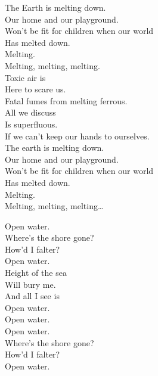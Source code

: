 The Earth is melting down. \\
Our home and our playground. \\
Won't be fit for children when our world \\
Has melted down. \\

Melting. \\
Melting, melting, melting. \\

Toxic air is \\
Here to scare us. \\
Fatal fumes from melting ferrous. \\
All we discuss \\
Is superfluous. \\
If we can't keep our hands to ourselves. \\

The earth is melting down. \\
Our home and our playground. \\
Won't be fit for children when our world \\
Has melted down. \\

Melting. \\
Melting, melting, melting… \\





Open water. \\
Where's the shore gone? \\
How'd I falter? \\
Open water. \\

Height of the sea \\
Will bury me. \\
And all I see is \\
Open water. \\

Open water. \\

Open water. \\
Where's the shore gone? \\
How'd I falter? \\
Open water. \\

